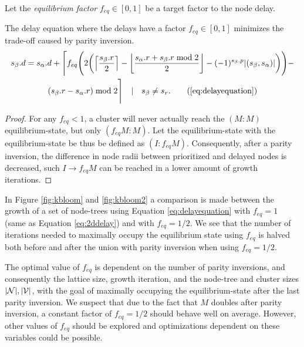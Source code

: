 \begin{definition}
  Let the \emph{equilibrium factor} $f_{eq}\in [0,1]$ be a target factor to the node delay. 
\end{definition}
\begin{lemma}
  The delay equation where the delays have a factor $f_{eq}\in [0,1]$ minimizes the trade-off caused by parity inversion. 
  \begin{multline}
    s_\beta.d = s_\alpha.d + \Bigg \lceil f_{eq} \Bigg( 2\bigg(\ceil{\frac{s_\beta.r}{2}} - \floor{\frac{s_\alpha.r + s_\beta.r \bmod 2}{2}} - (-1)^{s_\beta.p}\abs{(s_\beta,s_\alpha)}\bigg)
    \Bigg) - \\
    (s_\beta.r - s_\alpha.r) \bmod 2 \Bigg \rceil \hspace{1em} | \hspace{1em} s_\beta \neq s_r. \tag{\ref{eq:delayequation}}
  \end{multline}
\end{lemma}
\begin{proof}
  For any $f_{eq} < 1$, a cluster will never actually reach the $(M:M)$ equilibrium-state, but only $(f_{eq}M:M)$. Let the equilibrium-state with the equilibrium-state be thus be defined as $(I:f_{eq}M)$. Consequently, after a parity inversion, the difference in node radii between prioritized and delayed nodes is decreased, such $I\to f_{eq}M$ can be reached in a lower amount of growth iterations. 
\end{proof}

In Figure \ref{fig:kbloom} and \ref{fig:kbloom2} a comparison is made between the growth of a set of node-trees using Equation \eqref{eq:delayequation} with $f_{eq}=1$ (same as Equation \eqref{eq:2ddelay}) and with $f_{eq}=1/2$. We see that the number of iterations needed to maximally occupy the equilibrium state using $f_{eq}$ is halved both before and after the union with parity inversion when using $f_{eq} = 1/2$. 

The optimal value of $f_{eq}$ is dependent on the number of parity inversions, and consequently the lattice size, growth iteration, and the node-tree and cluster sizes $|\mathcal{N}|, |\mathcal{V}|$, with the goal of maximally occupying the equilibrium-state after the last parity inversion. We suspect that due to the fact that $M$ doubles after parity inversion, a constant factor of $f_{eq}=1/2$ should behave well on average. However, other values of $f_{eq}$ should be explored and optimizations dependent on these variables could be possible. 


 
